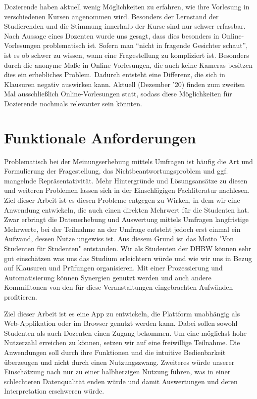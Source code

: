 Dozierende haben aktuell wenig Möglichkeiten zu erfahren, wie ihre Vorlesung in verschiedenen Kursen angenommen wird.
Besonders der Lernstand der Studierenden und die Stimmung innerhalb der Kurse sind nur schwer erfassbar.
Nach Aussage eines Dozenten wurde uns gesagt, dass dies besonders in Online-Vorlesungen problematisch ist.
Sofern man \enquote{nicht in fragende Gesichter schaut}, ist es ob schwer zu wissen, wann eine Fragestellung zu kompliziert ist.
Besonders durch die anonyme Maße in Online-Vorlesungen, die auch keine Kameras besitzen dies ein erhebliches Problem.
Dadurch entsteht eine Differenz, die sich in Klausuren negativ auswirken kann.
Aktuell (Dezember '20) finden zum zweiten Mal ausschließlich Online-Vorlesungen statt, sodass diese Möglichkeiten für Dozierende nochmals relevanter sein könnten.






\section{Funktionale Anforderungen} %
Problematisch bei der Meinungserhebung mittels Umfragen ist häufig die Art und Formulierung der Fragestellung, das Nichtbeantwortungsproblem und ggf. mangelnde Repräsentativität.
Mehr Hintergründe und Lösungsansätze zu diesen und weiteren Problemen lassen sich in der Einschlägigen Fachliteratur nachlesen.
Ziel dieser Arbeit ist es diesen Probleme entgegen zu Wirken, in dem wir eine Anwendung entwickeln, die auch einen direkten Mehrwert für die Studenten hat.
Zwar erbringt die Datenerhebung und Auswertung mittels Umfragen langfristige Mehrwerte, bei der Teilnahme an der Umfrage entsteht jedoch erst einmal ein Aufwand, dessen Nutze ungewiss ist.
Aus diesem Grund ist das Motto "Von Studenten für Studenten" entstanden.
Wir als Studenten der DHBW können sehr gut einschätzen was uns das Studium erleichtern würde und wie wir uns in Bezug auf Klausuren und Prüfungen organisieren.
Mit einer Prozessierung und Automatisierung können Synergien genutzt werden und auch andere Kommilitonen von den für diese Veranstaltungen eingebrachten Aufwänden profitieren. 

Ziel dieser Arbeit ist es eine App zu entwickeln, die Plattform unabhängig als Web-Applikation oder im Browser genutzt werden kann.
Dabei sollen sowohl Studenten als auch Dozenten einen Zugang bekommen.
Um eine möglichst hohe Nutzerzahl erreichen zu können, setzen wir auf eine freiwillige Teilnahme.
Die Anwendungen soll durch ihre Funktionen und die intuitive Bedienbarkeit überzeugen und nicht durch einen Nutzungszwang.
Zweiteres würde unserer Einschätzung nach nur zu einer halbherzigen Nutzung führen, was in einer schlechteren Datenqualität enden würde und damit Auswertungen und deren Interpretation erschweren würde. 

